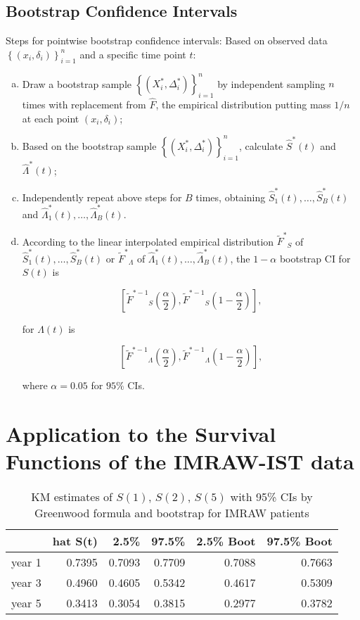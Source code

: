 \documentclass[11pt]{article}
\newcommand{\hsS}{\hat{S}^{*}}
\newcommand{\hsLam}{\hat{\Lambda}^{*}}
\newcommand{\hF}{\hat{F}}
\newcommand{\tsF}{{\tilde{F}^{*}}}
\newcommand{\invtsF}{{\tilde{F}^{*-1}}}
\begin{document}
\subsection{Bootstrap Confidence Intervals}
Steps for pointwise bootstrap confidence intervals:
Based on observed data $\left\{ (x_i,\delta_i) \right\}_{i=1}^n$ and a specific
time point $t$:
\begin{enumerate}[(a)]
\item Draw a bootstrap sample $\left\{ (X_i^{*},\Delta_i^{*}) \right\}_{i=1}^n$
  by independent sampling $n$ times with replacement from $\hF$, the empirical
  distribution putting mass $1/n$ at each point $(x_i,\delta_i)$;
\item Based on the bootstrap sample $\left\{ (X_i^{*},\Delta_i^{*})
  \right\}_{i=1}^n$, calculate $\hsS (t)$ and $\hsLam (t)$;
\item Independently repeat above steps for $B$ times, obtaining
  $\hsS_1(t),\dots, \hsS_B(t)$ and $\hsLam_1(t),\dots,\hsLam_B(t)$.
\item According to the linear interpolated empirical distribution $\tsF_S$ of
  $\hsS_1(t),\dots, \hsS_B(t)$ or $\tsF_{\Lambda}$ of
  $\hsLam_1(t),\dots,\hsLam_B(t)$, the $1-\alpha$ bootstrap CI for $S(t)$ is

\begin{equation*}
  \left[\invtsF_S\left(\frac{\alpha}{2}\right), \invtsF_S\left(1-\frac{\alpha}{2}\right)\right],
\end{equation*}

  for $\Lambda (t)$ is 
  
\begin{equation*}
\left[\invtsF_{\Lambda}\left(\frac{\alpha}{2}\right), \invtsF_{\Lambda}\left(1-\frac{\alpha}{2}\right)\right],
\end{equation*}

where $\alpha = 0.05$ for $95\%$ CIs.

\end{enumerate}

\section{Application to the Survival Functions of the IMRAW-IST data}

\begin{table}[H]
\centering
\begin{tabular}{rrrrrr}
  \hline
 & hat S(t) & 2.5\% & 97.5\% & 2.5\% Boot & 97.5\% Boot \\ 
  \hline
year 1 & 0.7395 & 0.7093 & 0.7709 & 0.7088 & 0.7663 \\ 
  year 3 & 0.4960 & 0.4605 & 0.5342 & 0.4617 & 0.5309 \\ 
  year 5 & 0.3413 & 0.3054 & 0.3815 & 0.2977 & 0.3782 \\ 
   \hline
\end{tabular}
\caption{KM estimates of $S(1)$, $S(2)$, $S(5)$
             with 95\% CIs by Greenwood formula and bootstrap for IMRAW patients} 
\end{table}
\end{document}
